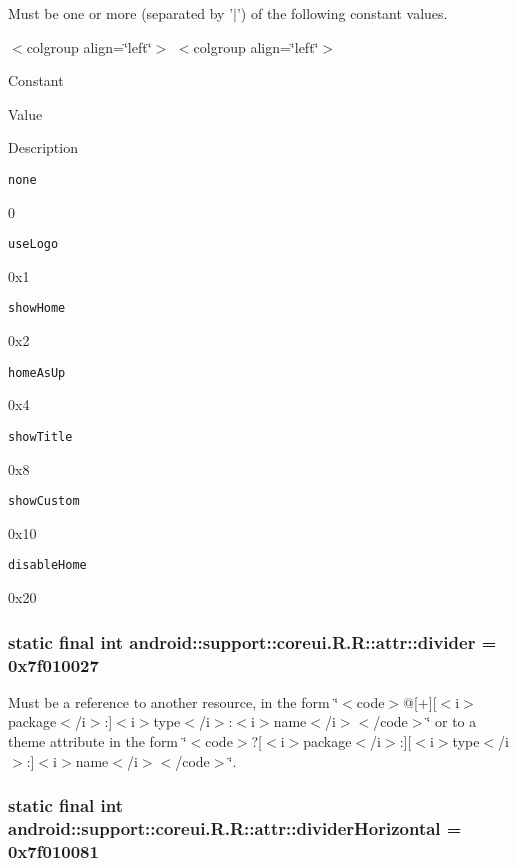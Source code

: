 Must be one or more (separated by '$|$') of the following constant values. \begin{TabularC}{0}
\hline
\end{TabularC}
$<$colgroup align=\char`\"{}left\char`\"{}$>$ $<$colgroup align=\char`\"{}left\char`\"{}$>$ 

Constant

Value

Description 

{\tt none}

0

{\tt useLogo}

0x1

{\tt showHome}

0x2

{\tt homeAsUp}

0x4

{\tt showTitle}

0x8

{\tt showCustom}

0x10

{\tt disableHome}

0x20\hypertarget{classandroid_1_1support_1_1coreui_1_1_r_1_1attr_523f1f260661a429af3adb6e45b7cf89}{
\subsubsection[{divider}]{\setlength{\rightskip}{0pt plus 5cm}static final int android::support::coreui.R.R::attr::divider = 0x7f010027}}
\label{classandroid_1_1support_1_1coreui_1_1_r_1_1attr_523f1f260661a429af3adb6e45b7cf89}


Must be a reference to another resource, in the form \char`\"{}$<$code$>$@\mbox{[}+\mbox{]}\mbox{[}$<$i$>$package$<$/i$>$:\mbox{]}$<$i$>$type$<$/i$>$:$<$i$>$name$<$/i$>$$<$/code$>$\char`\"{} or to a theme attribute in the form \char`\"{}$<$code$>$?\mbox{[}$<$i$>$package$<$/i$>$:\mbox{]}\mbox{[}$<$i$>$type$<$/i$>$:\mbox{]}$<$i$>$name$<$/i$>$$<$/code$>$\char`\"{}. \hypertarget{classandroid_1_1support_1_1coreui_1_1_r_1_1attr_22276824c05a22e03c31608b7e7ec75f}{
\subsubsection[{dividerHorizontal}]{\setlength{\rightskip}{0pt plus 5cm}static final int android::support::coreui.R.R::attr::dividerHorizontal = 0x7f010081}}
\label{classandroid_1_1support_1_1coreui_1_1_r_1_1attr_22276824c05a22e03c31608b7e7ec75f}


